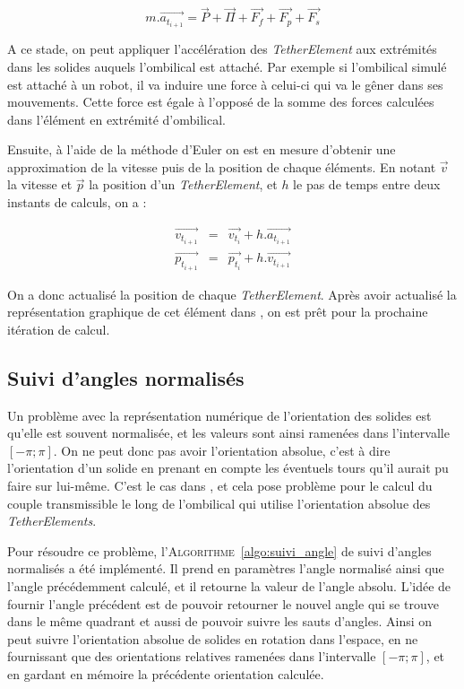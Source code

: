				\begin{equation}
					m.\overrightarrow{a_{t_{i+1}}} = \overrightarrow{P} + \overrightarrow{\Pi} + \overrightarrow{F_f} + \overrightarrow{F_p} + \overrightarrow{F_s}
					\label{eq:newton}
				\end{equation}

				A ce stade, on peut appliquer l'accélération des \textit{TetherElement} aux extrémités dans les solides auquels l'ombilical est attaché. Par exemple si l'ombilical simulé est attaché à un robot, il va induire une force à celui-ci qui va le gêner dans ses mouvements. Cette force est égale à l'opposé de la somme des forces calculées dans l'élément en extrémité d'ombilical.
				
				Ensuite, à l'aide de la méthode d'Euler on est en mesure d'obtenir une approximation de la vitesse puis de la position de chaque éléments. En notant $\overrightarrow{v}$ la vitesse et $\overrightarrow{p}$ la position d'un \textit{TetherElement}, et $h$ le pas de temps entre deux instants de calculs, on a :

				\begin{eqnarray}
					\overrightarrow{v_{t_{i+1}}} & = & \overrightarrow{v_{t_i}} + h.\overrightarrow{a_{t_{i+1}}} \\
					\overrightarrow{p_{t_{i+1}}} & = & \overrightarrow{p_{t_i}} + h.\overrightarrow{v_{t_{i+1}}}
					\label{eq:euler}
				\end{eqnarray}

				On a donc actualisé la position de chaque \textit{TetherElement}. Après avoir actualisé la représentation graphique de cet élément dans \gazebo{}, on est prêt pour la prochaine itération de calcul.
			
			\subsection{Suivi d'angles normalisés}
				Un problème avec la représentation numérique de l'orientation des solides est qu'elle est souvent normalisée, et les valeurs sont ainsi ramenées dans l'intervalle $[-\pi; \pi]$. On ne peut donc pas avoir l'orientation absolue, c'est à dire l'orientation d'un solide en prenant en compte les éventuels tours qu'il aurait pu faire sur lui-même. C'est le cas dans \gazebo{}, et cela pose problème pour le calcul du couple transmissible le long de l'ombilical qui utilise l'orientation absolue des \textit{TetherElements}.
			
				Pour résoudre ce problème, l'\textsc{Algorithme}~\ref{algo:suivi_angle} de suivi d'angles normalisés a été implémenté. Il prend en paramètres l'angle normalisé ainsi que l'angle précédemment calculé, et il retourne la valeur de l'angle absolu. L'idée de fournir l'angle précédent est de pouvoir retourner le nouvel angle qui se trouve dans le même quadrant et aussi de pouvoir suivre les sauts d'angles. Ainsi on peut suivre l'orientation absolue de solides en rotation dans l'espace, en ne fournissant que des orientations relatives ramenées dans l'intervalle $[-\pi; \pi]$, et en gardant en mémoire la précédente orientation calculée.
				

